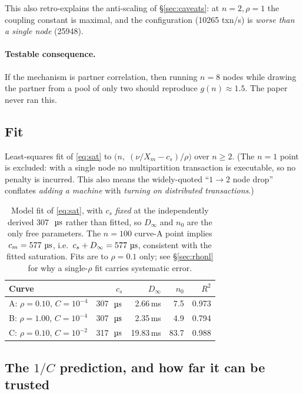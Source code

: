 \documentclass[11pt,a4paper]{article}
\newcommand{\hot}{C}
\newcommand{\pernode}{X_m}
\newcommand{\msecs}{\ensuremath{\,\text{\textmu}\text{s}}}
\newcommand{\gRatio}{g(n)}
\begin{document}
This also retro-explains the anti-scaling of \S\ref{sec:caveats}: at
$n{=}2,\rho{=}1$ the coupling constant is maximal, and the configuration
(\num{10265} txn/s) is \emph{worse than a single node} (\num{25948}).

\paragraph{Testable consequence.} If the mechanism is partner correlation,
then running $n{=}8$ nodes while drawing the partner from a pool of only two
should reproduce $\gRatio\approx1.5$. The paper never ran this.

\subsection{Fit}

Least-squares fit of \eqref{eq:sat} to $\bigl(n,\;(\nu/\pernode - c_s)/\rho\bigr)$
over $n\ge2$.  (The $n=1$ point is excluded: with a single node no
multipartition transaction is executable, so no penalty is incurred.  This
also means the widely-quoted ``$1\to2$ node drop'' conflates
\emph{adding a machine} with \emph{turning on distributed transactions}.)

\begin{table}[H]
\centering
\caption{Model fit of \eqref{eq:sat}, with $c_s$ \emph{fixed} at the independently
derived \SI{307}{\msecs} rather than fitted, so $D_\infty$ and $n_0$ are the
only free parameters. The $n=100$ curve-A point implies
$c_m=\SI{577}{\msecs}$, i.e.\ $c_s+D_\infty=\SI{577}{\msecs}$, consistent
with the fitted saturation. Fits are to $\rho=0.1$ only; see
\S\ref{sec:rhonl} for why a single-$\rho$ fit carries systematic error.}
\label{tab:fit}
\begin{tabular}{@{}lrrrr@{}}
\toprule
\textbf{Curve} & \textbf{$c_s$} & \textbf{$D_\infty$} & \textbf{$n_0$} &
\textbf{$R^2$} \\
\midrule
A: $\rho{=}0.10$, $\hot{=}10^{-4}$ & \SI{307}{\msecs} & \num{2.66}\,ms & \num{7.5} & 0.973 \\
B: $\rho{=}1.00$, $\hot{=}10^{-4}$ & \SI{307}{\msecs} & \num{2.35}\,ms & \num{4.9} & 0.794 \\
C: $\rho{=}0.10$, $\hot{=}10^{-2}$ & \SI{317}{\msecs} & \num{19.83}\,ms & \num{83.7} & 0.988 \\
\bottomrule
\end{tabular}
\end{table}

\subsection{The $1/\hot$ prediction, and how far it can be trusted}
\label{sec:oneoverC}
\end{document}
